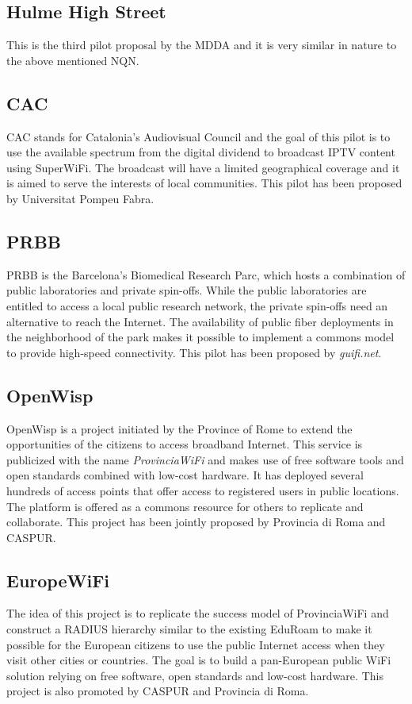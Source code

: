 \documentclass[conference]{IEEEtran}
\begin{document}
\subsection{Hulme High Street}
This is the third pilot proposal by the MDDA and it is very similar in nature to the above mentioned NQN.

\subsection{CAC}
CAC stands for Catalonia's Audiovisual Council and the goal of this pilot is to use the available spectrum from the digital dividend to broadcast IPTV content using SuperWiFi.
The broadcast will have a limited geographical coverage and it is aimed to serve the interests of local communities.
This pilot has been proposed by Universitat Pompeu Fabra.

\subsection{PRBB}
PRBB is the Barcelona's Biomedical Research Parc, which hosts a combination of public laboratories and private spin-offs.
While the public laboratories are entitled to access a local public research network, the private spin-offs need an alternative to reach the Internet.
The availability of public fiber deployments in the neighborhood of the park makes it possible to implement a commons model to provide high-speed connectivity.
This pilot has been proposed by \emph{guifi.net}.

\subsection{OpenWisp}
OpenWisp is a project initiated by the Province of Rome to extend the opportunities of the citizens to access broadband Internet.
This service is publicized with the name \emph{ProvinciaWiFi} and makes use of free software tools and open standards combined with low-cost hardware.
It has deployed several hundreds of access points that offer access to registered users in public locations.
The platform is offered as a commons resource for others to replicate and collaborate.
This project has been jointly proposed by Provincia di Roma and CASPUR.

\subsection{EuropeWiFi}
The idea of this project is to replicate the success model of ProvinciaWiFi and construct a RADIUS hierarchy similar to the existing EduRoam to make it possible for the European citizens to use the public Internet access when they visit other cities or countries.
The goal is to build a pan-European public WiFi solution relying on free software, open standards and low-cost hardware.
This project is also promoted by CASPUR and Provincia di Roma.
\end{document}
